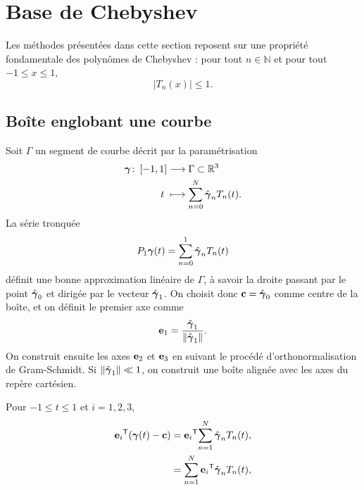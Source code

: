    
\section{Base de Chebyshev}
Les méthodes présentées dans cette section reposent sur une propriété fondamentale des polynômes de Chebyshev : pour tout $n \in \mathbb{N}$ et pour tout $-1 \leq x \leq 1$,
\begin{equation}
	\left| T_n(x) \right| \leq 1.
\end{equation}

\subsection{Boîte englobant une courbe}
Soit $\Gamma$ un segment de courbe décrit par la paramétrisation 
\begin{align}
  \boldsymbol{\gamma} \colon \left[ -1, 1 \right] &\longrightarrow \Gamma \subset \mathbb{R}^3 \nonumber \\
  t\; &\longmapsto \sum_{n=0}^{N} \hat{\boldsymbol{\gamma}}_n T_n(t).
\end{align}
%
La série tronquée
\begin{equation}
	P_{1}{\boldsymbol{\gamma}}(t) = \sum_{n=0}^{1} \hat{\boldsymbol{\gamma}}_n T_n(t)
\end{equation}
définit une bonne approximation linéaire de $\Gamma$, à savoir la droite passant par le point $\hat{\boldsymbol{\gamma}}_0$ et dirigée par le vecteur $\hat{\boldsymbol{\gamma}}_1$. 
On choisit donc $\mathbf{c} = \hat{\boldsymbol{\gamma}}_0$ comme centre de la boîte, et on définit le premier axe comme
\begin{equation}
	\mathbf{e}_1 = \frac{\hat{\boldsymbol{\gamma}}_1}{\left\| {\hat{\boldsymbol{\gamma}}_1} \right\|}.
\end{equation}
On construit ensuite les axes $\mathbf{e}_2$ et $\mathbf{e}_3$ en suivant le procédé d'orthonormalisation de Gram-Schmidt. Si $\left\| {\hat{\boldsymbol{\gamma}}_1} \right\| \ll 1$, on construit une boîte alignée avec les axes du repère cartésien.
\par
Pour $-1 \leq t \leq 1$ et $i=1,2,3$,
\begin{align*}
	{\mathbf{e}_i} ^\mathsf{T} {\left( \boldsymbol{\gamma}(t) - \mathbf{c} \right)} 
	&= {\mathbf{e}_i} ^\mathsf{T} {\sum_{n=1}^{N} \hat{\boldsymbol{\gamma}}_n T_n(t)} ,\\
	&= \sum_{n=1}^{N}{\mathbf{e}_i} ^\mathsf{T} {\hat{\boldsymbol{\gamma}}_n} T_n(t),
\end{align*}
